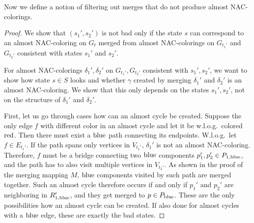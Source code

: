 Now we define a notion of filtering out
merges that do not produce almost NAC-colorings.
%
%
%
\begin{proof}
	We show that \( (s_1', s_2') \) is not bad only if the state \( s \)
	can correspond to an almost NAC-coloring on \( G_t \)
	merged from almost NAC-colorings on \( G_{t_1'} \) and \( G_{t_2'} \)
	consistent with states \( s_1' \) and \( s_2' \).

	For almost NAC-colorings \( \delta_1', \delta_2' \) on \( G_{t_1'}, G_{t_2'} \)
	consistent with \( s_1', s_2' \),
	we want to show how state \( s \in S \) looks and
	whether \rbcol{} \( \gamma \) created by merging \( \delta_1' \) and \( \delta_2' \)
	is an almost NAC-coloring.
	We show that this only depends on the states \( s_1', s_2' \),
	not on the structure of \( \delta_1' \) and \( \delta_2' \).

	First, let us go through cases how can an almost cycle be created.
	Suppose the only edge \( f \) with different color
	in an almost cycle and let it be w.l.o.g.\ colored \( \text{red} \).
	Then there must exist a \( \text{blue} \) path connecting its endpoints.
	W.l.o.g.\ let \( f \in E_{t_1'} \).
	If the path spans only vertices
	in \( V_{t_1'} \), \( \delta_1' \) is not an almost NAC-coloring.
	Therefore, \( f \) must be
	a bridge connecting two \( \text{blue} \) components \( p_1', p_2' \in P_{1,\text{blue}} \),
	and the path has to also visit multiple vertices in \( V_{t_2'} \).
	As shown in the proof of the merging mapping \( M \), \( \text{blue} \) components
	visited by such path are merged together.
	Such an almost cycle therefore occurs
	if and only if \( p_1' \) and \( p_2' \) are neighboring in \( R_{1,\text{blue}}' \),
	and they get merged to \( p \in P_{\text{blue}} \).
	These are the only possibilities how an almost cycle can be created.
	If also done for almost cycles with a \( \text{blue} \) edge,
	these are exactly the bad states.
\end{proof}
%

